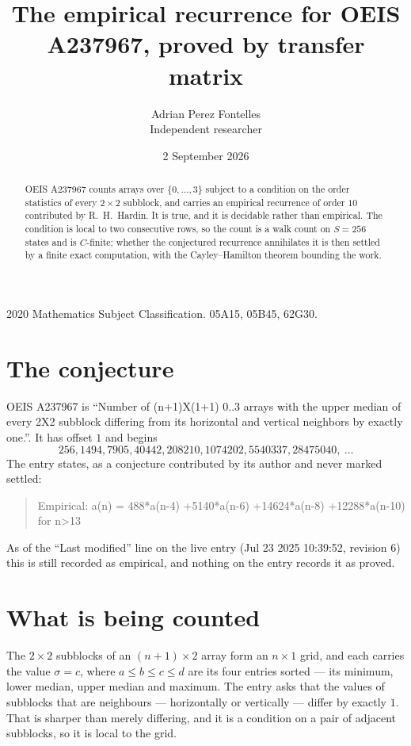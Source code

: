 \documentclass[11pt,a4paper]{article}
\title{The empirical recurrence for OEIS A237967, proved by transfer matrix}
\author{Adrian Perez Fontelles\\ \small Independent researcher}
\date{2 September 2026}
\theoremstyle{plain}
\theoremstyle{definition}
\begin{document}
\maketitle

\begin{abstract}
OEIS A237967 counts arrays over $\{0,\dots,3\}$ subject to a condition on the order
statistics of every $2\times2$ subblock, and carries an empirical recurrence of order
$10$ contributed by R.~H.~Hardin. It is true, and it is decidable rather than empirical.
The condition is local to two consecutive rows, so the count is a walk count on $S=256$
states and is $C$-finite; whether the conjectured recurrence annihilates it is then settled by
a finite exact computation, with the Cayley--Hamilton theorem bounding the work.
\end{abstract}

\noindent\small 2020 Mathematics Subject Classification. 05A15, 05B45, 62G30.\normalsize

\section{The conjecture}

OEIS A237967 is ``Number of (n+1)X(1+1) 0..3 arrays with the upper median of every 2X2 subblock differing from its horizontal and vertical neighbors by exactly one.''. It has offset $1$ and begins
\[
256, 1494, 7905, 40442, 208210, 1074202, 5540337, 28475040,\ \dots
\]
The entry states, as a conjecture contributed by its author and never marked settled:
\begin{quote}
Empirical: a(n) = 488*a(n-4) +5140*a(n-6) +14624*a(n-8) +12288*a(n-10) for n>13
\end{quote}
As of the ``Last modified'' line on the live entry (Jul 23 2025 10:39:52, revision 6) this is still
recorded as empirical, and nothing on the entry records it as proved.

\section{What is being counted}

The $2\times2$ subblocks of an $(n+1)\times2$ array form an
$n\times1$ grid, and each carries the value $\sigma=c$, where $a\le b\le c\le d$ are its four entries sorted --- its minimum, lower median, upper median and maximum. The entry asks that the values of
subblocks that are neighbours --- horizontally or vertically --- differ by exactly $1$.
That is sharper than merely differing, and it is a condition on a pair of adjacent subblocks,
so it is local to the grid.
\end{document}
